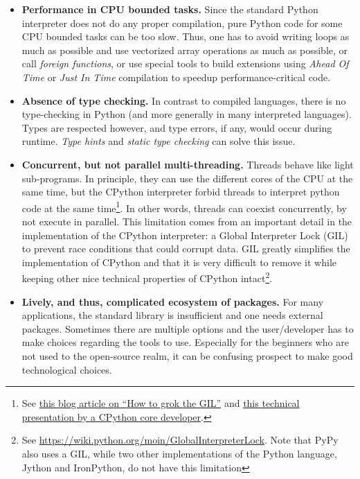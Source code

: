 \begin{itemize}

\item \textbf{Performance in CPU bounded tasks.} Since the standard Python
	interpreter does not do any proper compilation, pure Python code for
	some CPU bounded tasks can be too slow. Thus, one has to avoid writing
	loops as much as possible and use vectorized array operations as much
	as possible, or call \emph{foreign functions}, or use special tools to
	build extensions using \emph{Ahead Of Time} or \emph{Just In Time}
	compilation to speedup performance-critical code.

\item \textbf{Absence of type checking.} In contrast to compiled languages,
	there is no type-checking in Python (and more generally in many
	interpreted languages). Types are respected however, and type errors,
	if any, would occur during runtime.
	\emph{Type hints} and \emph{static type checking} can solve this issue.

\item \textbf{Concurrent, but not parallel multi-threading.} Threads behave
	like light sub-programs. In principle, they can use the different cores
	of the CPU at the same time, but the CPython interpreter forbid threads
	to interpret python code at the same time\footnote{See
	\href{https://opensource.com/article/17/4/grok-gil}{this blog article
on ``How to grok the GIL''} and
\href{https://faster-cpython.readthedocs.io/cpython37.html}{this technical
presentation by a CPython core developer}.}. In other words, threads can
coexist concurrently, by not execute in parallel.
%
This limitation comes from an important detail in the implementation of the
CPython interpreter: a Global Interpreter Lock (GIL) to prevent race conditions
that could corrupt data.
%
GIL greatly simplifies the implementation of CPython and that
it is very difficult to remove it while keeping other nice technical properties
of CPython intact\footnote{See
\url{https://wiki.python.org/moin/GlobalInterpreterLock}. Note that PyPy
also uses a GIL, while two other implementations of the Python language, Jython
and IronPython, do not have this limitation}.

\item \textbf{Lively, and thus, complicated ecosystem of packages.} For many
	applications, the standard library is insufficient and one needs
	external packages. Sometimes there are multiple options and the
	user/developer has to make choices regarding the tools to use.
	Especially for the beginners who are not used to the open-source realm,
	it can be confusing prospect to make good technological choices.

\end{itemize}

